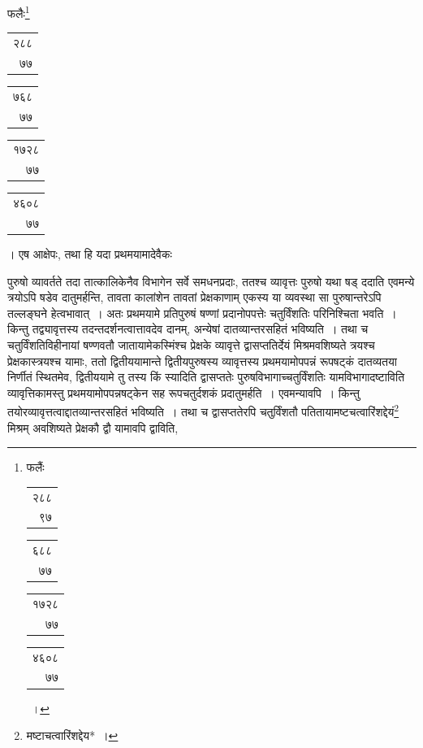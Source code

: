\documentclass[10pt, openany]{book}
\begin{document}
{{{फलैः\renewcommand{\thefootnote}{\s ४}\footnote{\s फलैंः \begin{tabular}{r|}२८८\\ ९७\\\hline \end{tabular}\begin{tabular}{r|} ६८८\\ ७७\\\hline \end{tabular}\begin{tabular}{r|}१७२८\\ ७७ \\\hline \end{tabular}\begin{tabular}{r|}४६०८\\ ७७\\\hline \end{tabular}~।}\begin{tabular}{r|}२८८\\ ७७\end{tabular}\begin{tabular}{r|} ७६८\\ ७७\end{tabular} \begin{tabular}{r|}१७२८\\ ७७\end{tabular}\begin{tabular}{r}४६०८\\ ७७\end{tabular}। एष आक्षेपः, तथा हि यदा
प्रथमयामादेवैकः}
{पुरुषो व्यावर्तते तदा तात्कालिकेनैव विभागेन सर्वे समधनप्रदाः, ततश्च
व्यावृत्तः पुरुषो}
{यथा षड् ददाति एवमन्ये त्रयोऽपि षडेव दातुमर्हन्ति, तावता कालांशेन तावतां
प्रेक्षकाणाम्}
{एकस्य या व्यवस्था सा पुरुषान्तरेऽपि तल्लङ्घने हेत्वभावात्~। अतः
प्रथमयामे प्रतिपुरुषं षण्णां}
{प्रदानोपपत्तेः चतुर्विंशतिः परिनिश्चिता भवति~। किन्तु तद्व्यावृत्तस्य
तदन्तदर्शनत्वात्तावदेव}
{दानम्, अन्येषां दातव्यान्तरसहितं भविष्यति~। तथा च चतुर्विंशतिविहीनायां
षण्णवतौ जातायामेकस्मिंश्च प्रेक्षके व्यावृत्ते द्वासप्ततिर्देयं मिश्रमवशिष्यते त्रयश्च
प्रेक्षकास्त्रयश्च यामाः, ततो}
{द्वितीययामान्ते द्वितीयपुरुषस्य व्यावृत्तस्य प्रथमयामोपपन्नं रूपषट्कं
दातव्यतया निर्णीतं स्थितमेव,}
{द्वितीययामे तु तस्य किं स्यादिति द्वासप्ततेः पुरुषविभागाच्चतुर्विंशतिः
यामविभागादष्टाविति}
{व्यावृत्तिकामस्तु प्रथमयामोपपन्नषट्केन सह रूपचतुर्दशकं प्रदातुमर्हति~।
एवमन्यावपि~। किन्तु}
{तयोरव्यावृत्तत्वाद्दातव्यान्तरसहितं भविष्यति~। तथा च द्वासप्ततेरपि
चतुर्विंशतौ पतितायामष्टचत्वारिंशद्देयं\renewcommand{\thefootnote}{\s ५}\footnote{\s *मष्टाचत्वारिंशद्देय*~।} मिश्रम् अवशिष्यते प्रेक्षकौ द्वौ यामावपि द्वाविति,
}}}
\end{document}
